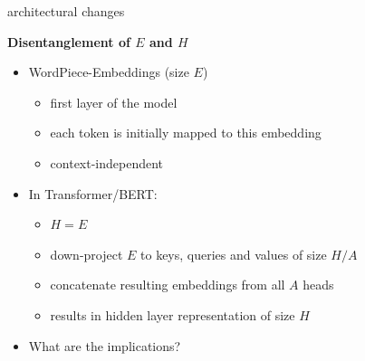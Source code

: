 \begin{frame}{architectural changes}

\vfill

	\textbf{Disentanglement of $E$ and $H$}

	\begin{itemize}
		\item	WordPiece-Embeddings (size $E$) 
			\begin{itemize}
				\item first layer of the model
				\item each token is initially mapped to this embedding
				\item context-independent
			\end{itemize}
		\item In Transformer/BERT: 
			\begin{itemize}
				\item $H = E$
				\item down-project $E$ to keys, queries and values of size $H/A$
				\item concatenate resulting embeddings from all $A$ heads
				\item results in hidden layer representation of size $H$
			\end{itemize}
		\item \ques What are the implications?
	\end{itemize}

\vfill

\end{frame}


